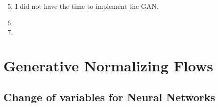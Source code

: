 \documentclass{article}
\begin{document}
\begin{enumerate}[label=\textbf{2.\arabic*}]
  \setcounter{enumi}{4}
  \item
  I did not have the time to implement the GAN.

  \item

  \item
\end{enumerate}


\section{Generative Normalizing Flows}

\subsection{Change of variables for Neural Networks}
\end{document}
